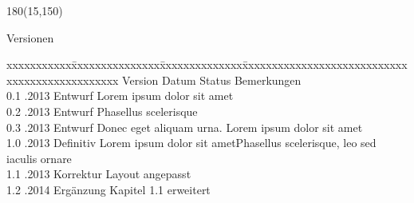 
\begin{textblock}{180}(15,150)
\color{black}
\begin{huge}
Versionen
\end{huge}
\vspace{10mm}

\fontsize{10pt}{18pt}\selectfont
\begin{tabbing}
xxxxxxxxxxx\=xxxxxxxxxxxxxxx\=xxxxxxxxxxxxxx\=xxxxxxxxxxxxxxxxxxxxxxxxxxxxxxxxxxxxxxxxxxxxxxx \kill
Version	\> Datum	\> Status		\> Bemerkungen		\\
0.1	.2013	\> Entwurf		\> Lorem ipsum dolor sit amet	\\	
0.2	.2013	\> Entwurf		\> Phasellus scelerisque	\\ 
0.3	.2013	\> Entwurf		\> Donec eget aliquam urna. Lorem ipsum dolor sit amet	\\ 
1.0	.2013	\> Definitiv	\> Lorem ipsum dolor sit ametPhasellus scelerisque, leo sed iaculis ornare 	\\ 
1.1	.2013	\> Korrektur	\> Layout angepasst	\\
1.2	.2014	\> Ergänzung	\> Kapitel 1.1 erweitert	\\
\end{tabbing}

\end{textblock}
